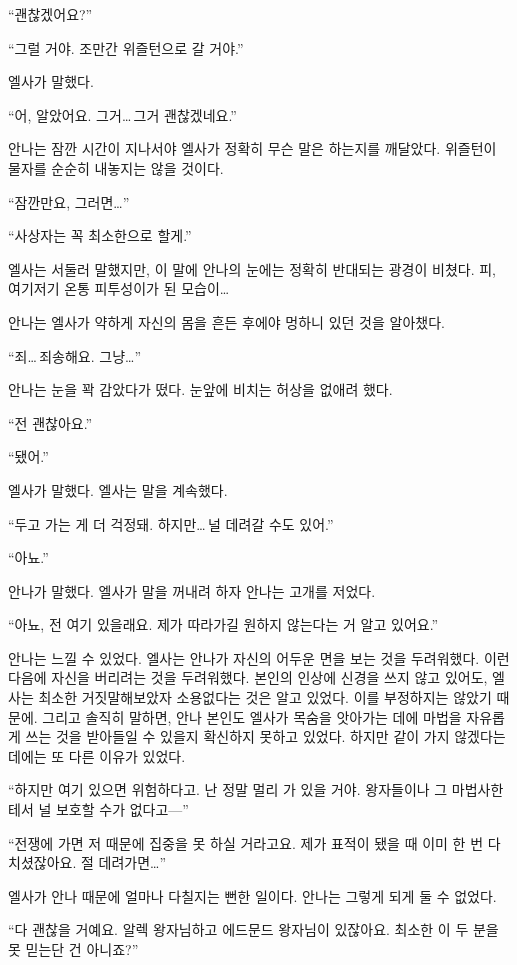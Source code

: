 ``괜찮겠어요?''

``그럴 거야. 조만간 위즐턴으로 갈 거야.''

엘사가 말했다.

``어, 알았어요. 그거\ldots\,그거 괜찮겠네요.''

안나는 잠깐 시간이 지나서야 엘사가 정확히 무슨 말은 하는지를 깨달았다. 위즐턴이 물자를 순순히 내놓지는 않을 것이다.

``잠깐만요, 그러면\ldots''

``사상자는 꼭 최소한으로 할게.''

엘사는 서둘러 말했지만, 이 말에 안나의 눈에는 정확히 반대되는 광경이 비쳤다. 피, 여기저기 온통 피투성이가 된 모습이\ldots

안나는 엘사가 약하게 자신의 몸을 흔든 후에야 멍하니 있던 것을 알아챘다.

``죄\ldots\,죄송해요. 그냥\ldots''

안나는 눈을 꽉 감았다가 떴다. 눈앞에 비치는 허상을 없애려 했다.

``전 괜찮아요.''

`` 됐어.''

엘사가 말했다. 엘사는 말을 계속했다.

``두고 가는 게 더 걱정돼. 하지만\ldots\,널 데려갈 수도 있어.''

``아뇨.''

안나가 말했다. 엘사가 말을 꺼내려 하자 안나는 고개를 저었다.

``아뇨, 전 여기 있을래요. 제가 따라가길 원하지 않는다는 거 알고 있어요.''

안나는 느낄 수 있었다. 엘사는 안나가 자신의 어두운 면을 보는 것을 두려워했다. 이런 다음에 자신을 버리려는 것을 두려워했다. 본인의 인상에 신경을 쓰지 않고 있어도, 엘사는 최소한 거짓말해보았자 소용없다는 것은 알고 있었다. 이를 부정하지는 않았기 때문에. 그리고 솔직히 말하면, 안나 본인도 엘사가 목숨을 앗아가는 데에 마법을 자유롭게 쓰는 것을 받아들일 수 있을지 확신하지 못하고 있었다. 하지만 같이 가지 않겠다는 데에는 또 다른 이유가 있었다.

``하지만 여기 있으면 위험하다고. 난 정말 멀리 가 있을 거야. 왕자들이나 그 마법사한테서 널 보호할 수가 없다고—''

``전쟁에 가면 저 때문에 집중을 못 하실 거라고요. 제가 표적이 됐을 때 이미 한 번 다치셨잖아요. 절 데려가면\ldots''

엘사가 안나 때문에 얼마나 다칠지는 뻔한 일이다. 안나는 그렇게 되게 둘 수 없었다.

``다 괜찮을 거예요. 알렉 왕자님하고 에드문드 왕자님이 있잖아요. 최소한 이 두 분을 못 믿는단 건 아니죠?''

